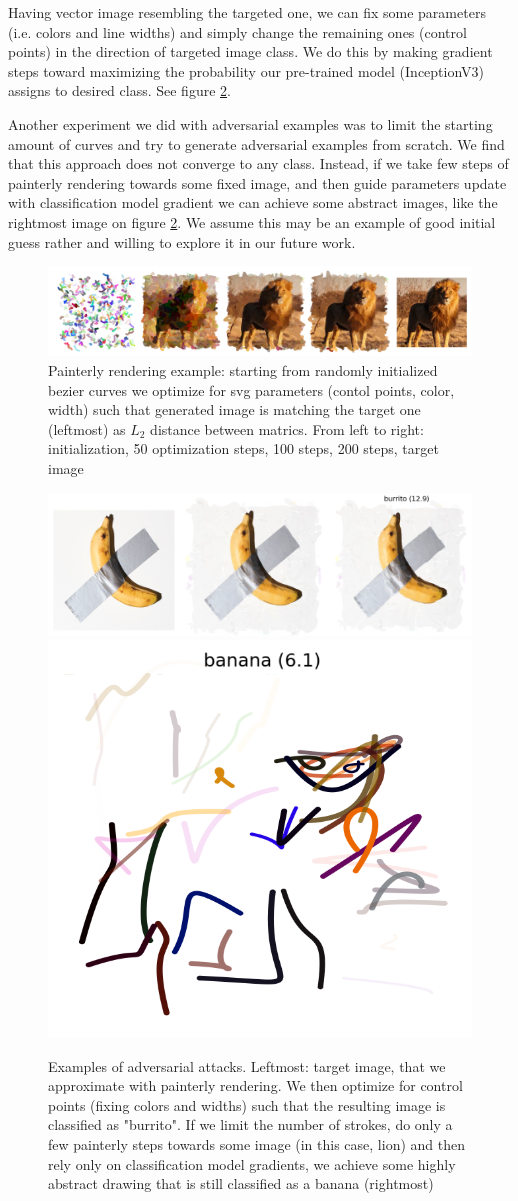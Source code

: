 \documentclass{article}
\begin{document}
Having vector image resembling the targeted one, we can fix some parameters (i.e. colors and line widths) and simply change the remaining ones (control points) in the direction of targeted image class. We do this by making gradient steps toward maximizing the probability our pre-trained model (InceptionV3) assigns to desired class. See figure \ref{fig:advex}.

Another experiment we did with adversarial examples was to limit the starting amount of curves and try to generate adversarial examples from scratch. We find that this approach does not converge to any class. Instead, if we take few steps of painterly rendering towards some fixed image, and then guide parameters update with classification model gradient we can achieve some abstract images, like the rightmost image on figure \ref{fig:advex}. We assume this may be an example of good initial guess rather and willing to explore it in our future work.

\begin{figure}
	\centering
	\includegraphics[width=0.9\linewidth]{img/paint_iterations.png}
	\caption{Painterly rendering example: starting from randomly initialized bezier curves we optimize for svg parameters (contol points, color, width) such that generated image is matching the target one (leftmost) as $L_2$ distance between matrics. From left to right: initialization, 50 optimization steps, 100 steps, 200 steps, target image}
	\label{fig:paint}
\end{figure}

\begin{figure}
	\centering
	\includegraphics[width=0.7\linewidth]{img/adversarial.png}
	\includegraphics[width=0.25\linewidth]{img/banana.png}
	\caption{Examples of adversarial attacks. Leftmost: target image, that we approximate with painterly rendering. We then optimize for control points (fixing colors and widths) such that the resulting image is classified as "burrito". If we limit the number of strokes, do only a few painterly steps towards some image (in this case, lion) and then rely only on classification model gradients, we achieve some highly abstract drawing that is still classified as a banana (rightmost)}
	\label{fig:advex}
\end{figure}
\end{document}
